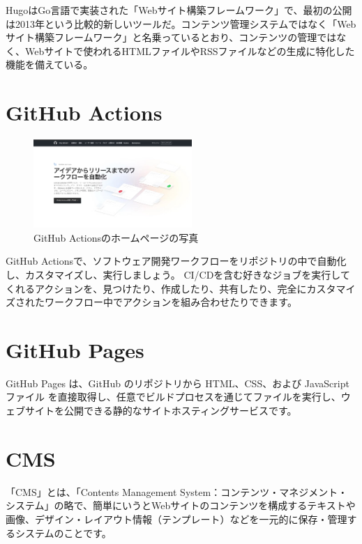   \begin{tcolorbox}[title=hugoとは]
    HugoはGo言語で実装された「Webサイト構築フレームワーク」で、最初の公開は2013年という比較的新しいツールだ。コンテンツ管理システムではなく「Webサイト構築フレームワーク」と名乗っているとおり、コンテンツの管理ではなく、Webサイトで使われるHTMLファイルやRSSファイルなどの生成に特化した機能を備えている。
    \cite{hugoとは} \cite{hugo公式}
  \end{tcolorbox}

\section{GitHub Actions}

  \begin{figure}[H]
    \centering
    \includegraphics[width=6cm]{./image/02-chap3/githubActions.png}
    \caption{GitHub Actionsのホームページの写真}
    \label{chap3-githubAction-image}
  \end{figure}

  \begin{tcolorbox}[title=GitHub Pagesとは]
    GitHub Actionsで、ソフトウェア開発ワークフローをリポジトリの中で自動化し、カスタマイズし、実行しましょう。 CI/CDを含む好きなジョブを実行してくれるアクションを、見つけたり、作成したり、共有したり、完全にカスタマイズされたワークフロー中でアクションを組み合わせたりできます。
    \cite{githubAction}
  \end{tcolorbox}

\section{GitHub Pages}

  \begin{tcolorbox}[title=hugoとは]
    GitHub Pages は、GitHub のリポジトリから HTML、CSS、および JavaScript ファイル を直接取得し、任意でビルドプロセスを通じてファイルを実行し、ウェブサイトを公開できる静的なサイトホスティングサービスです。
    \cite{githubPages}
  \end{tcolorbox}


\section{CMS}

  \begin{tcolorbox}[title=CMSとは]
    「CMS」とは、「Contents Management System：コンテンツ・マネジメント・システム」の略で、簡単にいうとWebサイトのコンテンツを構成するテキストや画像、デザイン・レイアウト情報（テンプレート）などを一元的に保存・管理するシステムのことです。
    \cite{cmsとは}
  \end{tcolorbox}

